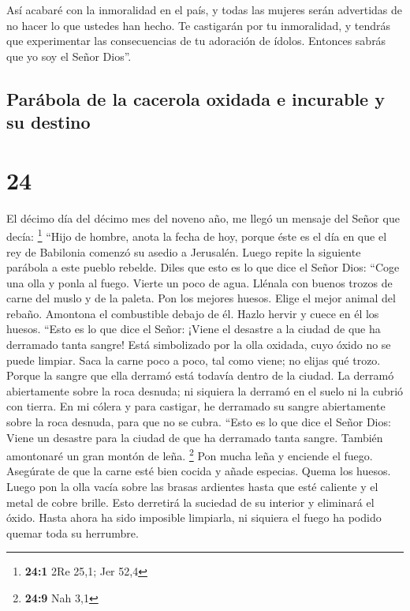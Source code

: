  Así acabaré con la inmoralidad en el país, y todas las
mujeres serán advertidas de no hacer lo que ustedes han hecho.
 Te castigarán por tu inmoralidad, y tendrás que
experimentar las consecuencias de tu adoración de ídolos. Entonces
sabrás que yo soy el Señor Dios''.

\hypertarget{paruxe1bola-de-la-cacerola-oxidada-e-incurable-y-su-destino}{%
\subsection{Parábola de la cacerola oxidada e incurable y su
destino}\label{paruxe1bola-de-la-cacerola-oxidada-e-incurable-y-su-destino}}

\hypertarget{section-23}{%
\section{24}\label{section-23}}

 El décimo día del décimo mes del noveno año, me llegó un
mensaje del Señor que decía: \footnote{\textbf{24:1} 2Re 25,1; Jer 52,4}
 ``Hijo de hombre, anota la fecha de hoy, porque éste es
el día en que el rey de Babilonia comenzó su asedio a Jerusalén.
 Luego repite la siguiente parábola a este pueblo rebelde.
Diles que esto es lo que dice el Señor Dios: ``Coge una olla y ponla al
fuego. Vierte un poco de agua.  Llénala con buenos trozos
de carne del muslo y de la paleta. Pon los mejores huesos.
 Elige el mejor animal del rebaño. Amontona el combustible
debajo de él. Hazlo hervir y cuece en él los huesos. 
``Esto es lo que dice el Señor: ¡Viene el desastre a la ciudad de que ha
derramado tanta sangre! Está simbolizado por la olla oxidada, cuyo óxido
no se puede limpiar. Saca la carne poco a poco, tal como viene; no
elijas qué trozo.  Porque la sangre que ella derramó está
todavía dentro de la ciudad. La derramó abiertamente sobre la roca
desnuda; ni siquiera la derramó en el suelo ni la cubrió con tierra.
 En mi cólera y para castigar, he derramado su sangre
abiertamente sobre la roca desnuda, para que no se cubra. 
``Esto es lo que dice el Señor Dios: Viene un desastre para la ciudad de
que ha derramado tanta sangre. También amontonaré un gran montón de
leña. \footnote{\textbf{24:9} Nah 3,1}  Pon mucha leña y
enciende el fuego. Asegúrate de que la carne esté bien cocida y añade
especias. Quema los huesos.  Luego pon la olla vacía
sobre las brasas ardientes hasta que esté caliente y el metal de cobre
brille. Esto derretirá la suciedad de su interior y eliminará el óxido.
 Hasta ahora ha sido imposible limpiarla, ni siquiera el
fuego ha podido quemar toda su herrumbre.


